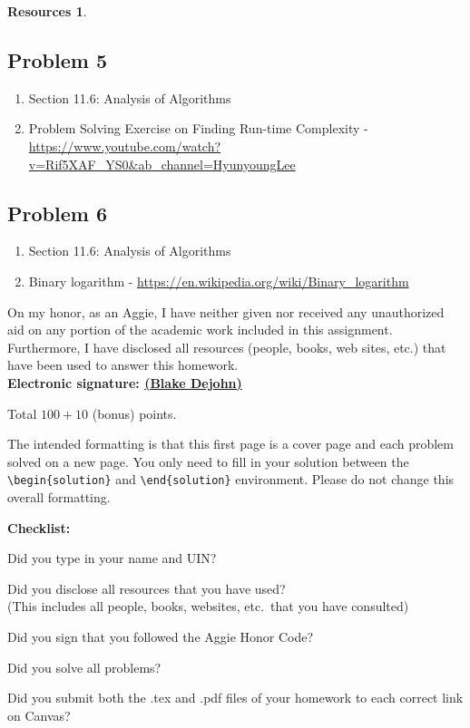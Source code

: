 \documentclass{article}
\theoremstyle{definition}
\newtheorem*{solution}{Solution}
\newtheorem*{resources}{Resources}
\newcommand{\honor}{\noindent On my honor, as an Aggie, I have neither
  given nor received any unauthorized aid on any portion of the
  academic work included in this assignment. Furthermore, I have
  disclosed all resources (people, books, web sites, etc.) that have
  been used to answer this homework. \\[2ex]
 \textbf{Electronic signature: \underline{ (Blake Dejohn) } } } %
\newcommand{\checklist}{\noindent\textbf{Checklist:}
\begin{compactitem}[$\Box$] 
\item [\checkmark] Did you type in your name and UIN? 
\item [\checkmark] Did you disclose all resources that you have used? \\
(This includes all people, books, websites, etc.\ that you have consulted)
\item [\checkmark] Did you sign that you followed the Aggie Honor Code? 
\item [\checkmark] Did you solve all problems? 
\item [\checkmark] Did you submit both the .tex and .pdf files of your homework to each correct link on Canvas? 
\end{compactitem}
}
\begin{document}
\begin{resources}
\subsection*{Problem 5}
\begin{enumerate}
\item Section 11.6: Analysis of Algorithms
\item Problem Solving Exercise on Finding Run-time Complexity - \url{https://www.youtube.com/watch?v=Rif5XAF_YS0&ab_channel=HyunyoungLee}
\end{enumerate}
\subsection*{Problem 6}
\begin{enumerate}
\item Section 11.6: Analysis of Algorithms
\item Binary logarithm - \url{https://en.wikipedia.org/wiki/Binary_logarithm}
\end{enumerate}

\end{resources}
\honor

\bigskip

\noindent
Total $100+10$ (bonus) points.

\bigskip

\noindent
The intended formatting is that this first page is a cover page and each 
problem solved on a new page. You only need to fill in your solution between 
the \verb|\begin{solution}| and \verb|\end{solution}| environment.  
Please do not change this overall formatting.

\bigskip

\vfill
\checklist
\end{document}
